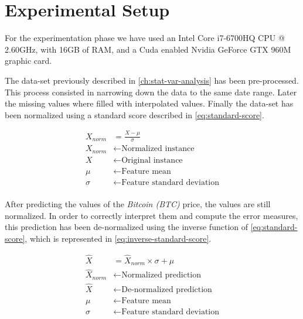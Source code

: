 
\chapter{Experimental Setup}
\label{ch:experimental-setup}

For the experimentation phase we have used an Intel Core i7-6700HQ CPU
@ 2.60GHz, with 16GB of RAM, and a Cuda enabled Nvidia GeForce GTX
960M graphic card.

The data-set previously described in \autoref{ch:stat-var-analysis}
has been pre-processed. This process consisted in narrowing down the
data to the same date range. Later the missing values where filled
with interpolated values. Finally the data-set has been normalized
using a standard score described in \autoref{eq:standard-score}.

\begin{equation}
  \begin{aligned}
    \label{eq:standard-score} X_{norm} & = \frac{X-\mu}{\sigma} \\
X_{norm} & \leftarrow \text{Normalized instance} \\ X & \leftarrow
\text{Original instance} \\ \mu & \leftarrow \text{Feature mean} \\
\sigma & \leftarrow \text{Feature standard deviation} \\
  \end{aligned}
\end{equation}

After predicting the values of the \textit{Bitcoin (BTC)} price, the
values are still normalized. In order to correctly interpret them and
compute the error measures, this prediction has been de-normalized
using the inverse function of \autoref{eq:standard-score}, which is
represented in \autoref{eq:inverse-standard-score}.

\begin{equation}
  \begin{aligned}
    \label{eq:inverse-standard-score} \hat{X} & = \hat{X}_{norm}
\times \sigma + \mu \\ \hat{X}_{norm} & \leftarrow \text{Normalized
prediction} \\ \hat{X} & \leftarrow \text{De-normalized prediction} \\
\mu & \leftarrow \text{Feature mean} \\ \sigma & \leftarrow
\text{Feature standard deviation} \\
  \end{aligned}
\end{equation}

